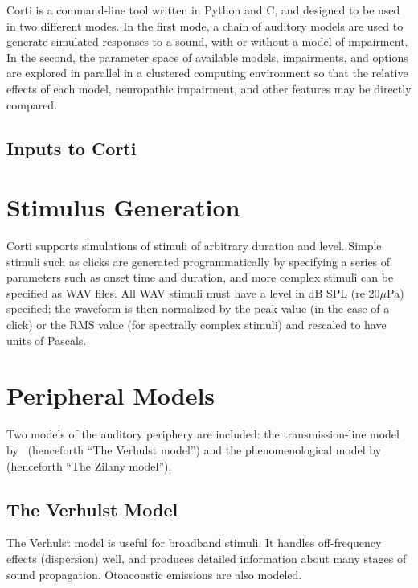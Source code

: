 Corti is a command-line tool written in Python and C, and designed to be used in two different modes.  In the first mode, a chain of auditory models are used to generate simulated responses to a sound, with or without a model of impairment.  In the second, the parameter space of available models, impairments, and options are explored in parallel in a clustered computing environment so that the relative effects of each model, neuropathic impairment, and other features may be directly compared.
\subsection{Inputs to Corti} %
\label{sub:inputs_to_corti}

\section{Stimulus Generation} %
\label{sec:stimulus_generation}
Corti supports simulations of stimuli of arbitrary duration and level.  Simple stimuli such as clicks are generated programmatically by specifying a series of parameters such as onset time and duration, and more complex stimuli can be specified as WAV files.  All WAV stimuli must have a level in dB SPL (re 20$\mu$Pa) specified; the waveform is then normalized by the peak value (in the case of a click) or the RMS value (for spectrally complex stimuli) and rescaled to have units of Pascals. 
\section{Peripheral Models} %
\label{sec:peripheral_models}
Two models of the auditory periphery are included: the transmission-line model by~\cite{Verhulst2015Functional} (henceforth ``The Verhulst model'') and the phenomenological model by~\cite{Zilany2014Updated} (henceforth ``The Zilany model'').

\subsection{The Verhulst Model} %
\label{sub:the_verhulst_model1}
The Verhulst model is useful for broadband stimuli.  It handles off-frequency effects (dispersion) well, and produces detailed information about many stages of sound propagation.  Otoacoustic emissions are also modeled. 

